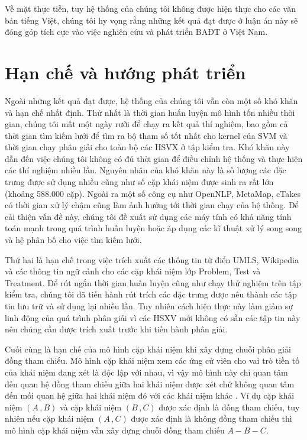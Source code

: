Về mặt thực tiễn, tuy hệ thống của chúng tôi không được hiện thực cho các văn bản tiếng Việt, chúng tôi hy vọng rằng những kết quả đạt được ở luận án này sẽ đóng góp tích cực vào việc nghiên cứu và phát triển BAĐT ở Việt Nam.

\section{Hạn chế và hướng phát triển}
Ngoài những kết quả đạt được, hệ thống của chúng tôi vẫn còn một số khó khăn và hạn chế nhất định. Thứ nhất là thời gian huấn luyện mô hình tốn nhiều thời gian, chúng tôi mất một ngày rưỡi để chạy ra kết quả thí nghiệm, bao gồm cả thời gian tìm kiếm lưới để tìm ra bộ tham số tốt nhất cho kernel của SVM và thời gian chạy phân giải cho toàn bộ các HSVX ở tập kiểm tra. Khó khăn này dẫn đến việc chúng tôi không có đủ thời gian để điều chỉnh hệ thống và thực hiện các thí nghiệm nhiều lần. Nguyên nhân của khó khăn này là số lượng các đặc trưng được sử dụng nhiều cũng như số cặp khái niệm được sinh ra rất lớn (khoảng 588.000 cặp). Ngoài ra một số công cụ như OpenNLP, MetaMap, cTakes có thời gian xử lý chậm cũng làm ảnh hưởng tới thời gian chạy của hệ thống. Để cải thiện vấn đề này, chúng tôi đề xuất sử dụng các máy tính có khả năng tính toán mạnh trong quá trình huấn luyện hoặc áp dụng các kĩ thuật xử lý song song và hệ phân bố cho việc tìm kiếm lưới.

Thứ hai là hạn chế trong việc trích xuất các thông tin từ điển UMLS, Wikipedia và các thông tin ngữ cảnh cho các cặp khái niệm lớp Problem, Test và Treatment. Để rút ngắn thời gian huấn luyện cũng như chạy thử nghiệm trên tập kiểm tra, chúng tôi đã tiến hành rút trích các đặc trưng được nêu thành các tập tin lưu trữ và sử dụng lại nhiều lần. Tuy nhiên cách hiện thực này làm giảm sự linh động của quá trình phân giải vì các HSXV mới không có sẵn các tập tin này nên chúng cần được trích xuất trước khi tiến hành phân giải.

Cuối cùng là hạn chế của mô hình cặp khái niệm khi xây dựng chuỗi phân giải đồng tham chiếu. Mô hình cặp khái niệm xem các ứng cử viên cho vai trò tiền tố của khái niệm đang xét là độc lập với nhau, vì vậy mô hình này chỉ quan tâm đến quan hệ đồng tham chiếu giữa hai khái niệm được xét chứ không quan tâm đến mối quan hệ giữa hai khái niệm đó với các khái niệm khác \cite{VincentNg2010}. Ví dụ cặp khái niệm $(A\,,B)$ và cặp khái niệm $(B\,,C)$ được xác định là đồng tham chiếu, tuy nhiên nếu cặp khái niệm $(A\,,C)$ được xác định là không đồng tham chiếu thì mô hình cặp khái niệm vẫn xây dựng chuỗi đồng tham chiếu $A-B-C$.

